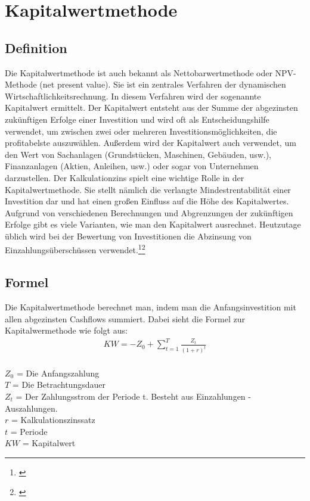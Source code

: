 \chapter{Kapitalwertmethode}
\label{Kapitalwertmethode}

\section{Definition}
Die Kapitalwertmethode ist auch bekannt als Nettobarwertmethode oder NPV-Methode (net present value).
Sie ist ein zentrales Verfahren der dynamischen Wirtschaftlichkeitsrechnung. In diesem Verfahren wird der sogenannte Kapitalwert ermittelt. Der Kapitalwert entsteht aus der Summe der abgezinsten zukünftigen Erfolge einer Investition und wird oft als Entscheidungshilfe verwendet, um zwischen zwei oder mehreren Investitionsmöglichkeiten, die profitabelste auszuwählen. Außerdem wird der Kapitalwert auch verwendet, um den Wert von Sachanlagen (Grundstücken, Maschinen, Gebäuden, usw.), Finanzanlagen (Aktien, Anleihen, usw.) oder sogar von Unternehmen darzustellen.
Der Kalkulationzins spielt eine wichtige Rolle in der Kapitalwertmethode. Sie stellt nämlich die verlangte Mindestrentabilität einer Investition dar und hat einen großen Einfluss auf die Höhe des Kapitalwertes.
Aufgrund von verschiedenen Berechnungen und Abgrenzungen der zukünftigen Erfolge gibt es viele Varianten, wie man den Kapitalwert ausrechnet. Heutzutage üblich wird bei der Bewertung von Investitionen die Abzinsung von Einzahlungsüberschüssen verwendet.\footnote{\cite{wikipedia-kapitalwertmethode}}\footnote{\cite{weltsparen-kapitalwertmethode}}
\newpage
\section{Formel}
Die Kapitalwertmethode berechnet man, indem man die Anfangsinvestition mit allen abgezinsten Cashflows summiert. Dabei sieht die Formel zur Kapitalwermethode wie folgt aus:
\begin{align*}
    KW = -Z_{0} + \sum \limits_{t=1}^{T}{\frac{Z_{t}}{(1+r)^{t}}}
\end{align*}
\\
$Z_0$ = Die Anfangszahlung \\
$T$  = Die Betrachtungsdauer\\
$Z_t$ = Der Zahlungsstrom der Periode t. Besteht aus Einzahlungen - Auszahlungen.\\
$r$ = Kalkulationszinssatz\\
$t$ = Periode\\
$KW$ = Kapitalwert
